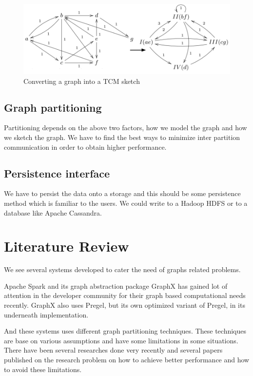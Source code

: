 \documentclass[12pt]{article}
\begin{document}
\begin{figure}[H]
\centering
\includegraphics[scale=0.3]{graph-sketching.png}
\caption{Converting a graph into a TCM sketch}
\label{fig:graph-sketching}
\end{figure}

\subsection{Graph partitioning}
Partitioning depends on the above two factors, how we model the graph and how we sketch the graph. We have to find the best ways to minimize inter partition communication in order to obtain higher performance.

\subsection{Persistence interface}
We have to persist the data onto a storage and this should  be some persistence method which is familiar to the users. We could write to a Hadoop HDFS or to a database like Apache Cassandra.

\clearpage
\section{Literature Review}

We see several systems developed to cater the need of graphs related problems.

Apache Spark and its graph abstraction package GraphX\cite{GraphX} has gained lot of attention in the developer community for their graph based computational needs recently. GraphX also uses Pregel, but its own optimized variant of Pregel, in its underneath implementation.

And these systems uses different graph partitioning techniques. These techniques are base on various assumptions and have some limitations in some situations. There have been several researches done very recently and several papers published on the research problem on how to achieve better performance and how to avoid these limitations. 
\end{document}

